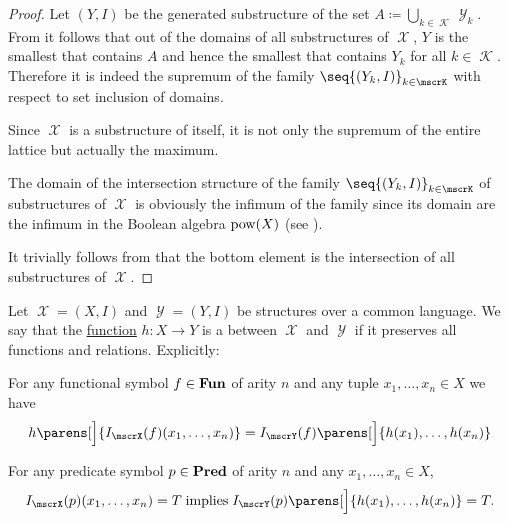 \begin{proof}
   Let \( (Y, I) \) be the generated substructure of the set \( A \coloneqq \bigcup_{k \in \mscrK} \mscrY_k \). From  it follows that out of the domains of all substructures of \( \mscrX \), \( Y \) is the smallest that contains \( A \) and hence the smallest that contains \( Y_k \) for all \( k \in \mscrK \). Therefore it is indeed the supremum of the family \( \seq{ (Y_k, I) }_{k \in \mscrK} \) with respect to set inclusion of domains.

   Since \( \mscrX \) is a substructure of itself, it is not only the supremum of the entire lattice but actually the maximum.

   The domain of the intersection structure of the family \( \seq{ (Y_k, I) }_{k \in \mscrK} \) of substructures of \( \mscrX \) is obviously the infimum of the family since its domain are the infimum in the Boolean algebra \( \operatorname{pow}(X) \) (see ).

   It trivially follows from  that the bottom element is the intersection of all substructures of \( \mscrX \).
\end{proof}

\begin{definition}\label{def:first_order_homomorphism}
  Let \( \mscrX = (X, I) \) and \( \mscrY = (Y, I) \) be structures over a common language. We say that the \hyperref[def:function]{function} \( h: X \to Y \) is a  between \( \mscrX \) and \( \mscrY \) if it preserves all functions and relations. Explicitly:
  \begin{thmenum}
     For any functional symbol \( f \in \operatorname{\mathbf{Fun}} \) of arity \( n \) and any tuple \( x_1, \ldots, x_n \in X \) we have
    \begin{equation*}
      h\parens[\Big]{ I_\mscrX(f)(x_1, \ldots, x_n) } = I_\mscrY(f) \parens[\Big]{ h(x_1), \ldots, h(x_n) }
    \end{equation*}

     For any predicate symbol \( p \in \operatorname{\mathbf{Pred}} \) of arity \( n \) and any \( x_1, \ldots, x_n \in X \),
    \begin{equation*}
      I_\mscrX(p) (x_1, \ldots, x_n) = T \T{implies} I_\mscrY(p) \parens[\Big]{ h(x_1), \ldots, h(x_n) } = T.
    \end{equation*}
  \end{thmenum}
\end{definition}

